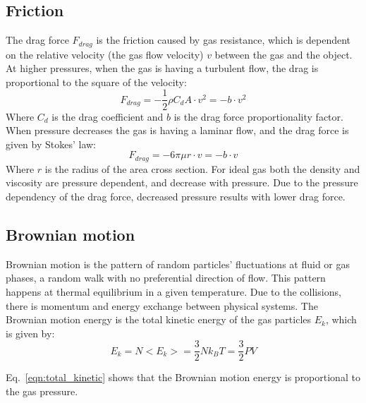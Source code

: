 \documentclass[\main/master.tex]{subfiles}
\begin{document}
\subsection{Friction}
The drag force $F_{drag}$ is the friction caused by gas resistance, which is dependent on the relative velocity (the gas flow velocity) $v$ between the gas and the object. At higher pressures, when the gas is having a turbulent flow, the drag is proportional to the square of the velocity:
\begin{equation}
F_{drag} = -\frac{1}{2}\rho C_d A \cdot v^2 = -b\cdot v^2 
\label{eqn:drag force}
\end{equation}
Where $C_d$ is the drag coefficient and $b$ is the drag force proportionality factor. When pressure decreases the gas is having a laminar flow, and the drag force is given by Stokes' law:
\begin{equation}
F_{drag} = -6\pi\mu r\cdot v = -b\cdot v
\label{eqn:drag force}
\end{equation}
Where $r$ is the radius of the area cross section. For ideal gas both the density and viscosity are pressure dependent, and decrease with pressure. Due to the pressure dependency of the drag force, decreased pressure results with lower drag force.

\subsection{Brownian motion}
Brownian motion is the pattern of random particles' fluctuations at fluid or gas phases, a random walk with no preferential direction of flow. This pattern happens at thermal equilibrium in a given temperature. Due to the collisions, there is momentum and energy exchange between physical systems. The Brownian motion energy is the total kinetic energy of the gas particles $E_k$, which is given by:
\begin{equation}
E_k = N<E_k> = \frac{3}{2} N k_B T = \frac{3}{2} PV
\label{eqn:total_kinetic}
\end{equation}
\par\noindent
Eq.~\ref{eqn:total_kinetic} shows that the Brownian motion energy is proportional to the gas pressure. 
\end{document}
